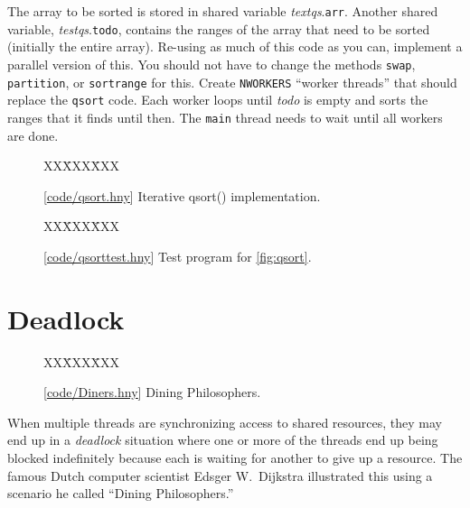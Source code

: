 \documentclass{report}
\newcommand{\harmonysource}[1]{
\begin{tabbing}
XX\=XXX\=XXX\kill
    
\end{tabbing}
}
\newcommand{\harmonylink}[1]{%
[\href{https://harmony.cs.cornell.edu/#1}{\underline{#1}}]%
}
\newenvironment{code}{
\tcolorbox
}{
\endtcolorbox
}
\begin{document}
\begin{problems}
The array to be sorted is stored in shared variable \textit{textqs}.\texttt{arr}.
Another shared variable, \textit{testqs}.\texttt{todo}, contains the ranges of the
array that need to be sorted (initially the entire array).
Re-using as much of this code as you can, implement a parallel version of
this.  You should not have to change the methods \texttt{swap}, \texttt{partition},
or \texttt{sortrange} for this.  Create \texttt{NWORKERS} ``worker threads''
that should replace the \texttt{qsort} code.
Each worker loops until \textit{todo}
is empty and sorts the ranges that it finds until then.  The \texttt{main}
thread needs to wait until all workers are done.
\end{problems}

\begin{figure}
\begin{code}
\harmonysource{qsort}
\end{code}
\caption{\harmonylink{code/qsort.hny} Iterative qsort() implementation.}
\label{fig:qsort}
\end{figure}

\begin{figure}
\begin{code}
\harmonysource{qsorttest}
\end{code}
\caption{\harmonylink{code/qsorttest.hny} Test program for \autoref{fig:qsort}.}
\label{fig:qsorttest}
\end{figure}

\chapter{Deadlock}
\label{ch:deadlock}
%

%

\begin{figure}
\begin{code}
\harmonysource{Diners}
\end{code}
\caption{\harmonylink{code/Diners.hny} Dining Philosophers.}
\label{fig:diners}
\end{figure}

When multiple threads are synchronizing access to shared resources, they
may end up in a \emph{deadlock} situation where one or more of the threads
end up being blocked indefinitely because each is waiting for another to give
up a resource.
The famous Dutch computer scientist Edsger W.~Dijkstra illustrated this using
a scenario he called ``Dining Philosophers.''
%
\end{document}

